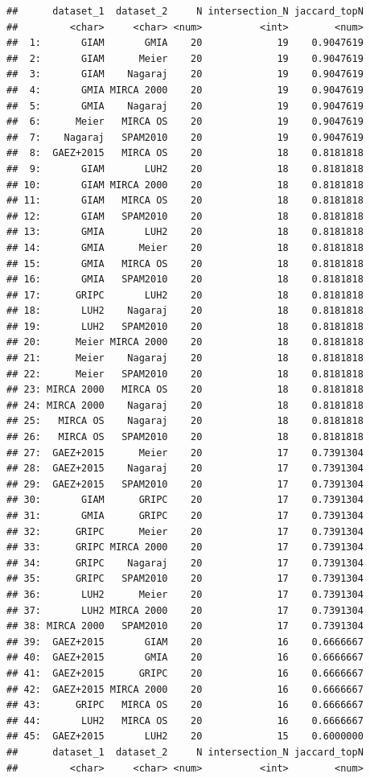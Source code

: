 \documentclass[
  11pt,
]{article}
\begin{document}
\begin{verbatim}
##      dataset_1  dataset_2     N intersection_N jaccard_topN
##         <char>     <char> <num>          <int>        <num>
##  1:       GIAM       GMIA    20             19    0.9047619
##  2:       GIAM      Meier    20             19    0.9047619
##  3:       GIAM    Nagaraj    20             19    0.9047619
##  4:       GMIA MIRCA 2000    20             19    0.9047619
##  5:       GMIA    Nagaraj    20             19    0.9047619
##  6:      Meier   MIRCA OS    20             19    0.9047619
##  7:    Nagaraj   SPAM2010    20             19    0.9047619
##  8:  GAEZ+2015   MIRCA OS    20             18    0.8181818
##  9:       GIAM       LUH2    20             18    0.8181818
## 10:       GIAM MIRCA 2000    20             18    0.8181818
## 11:       GIAM   MIRCA OS    20             18    0.8181818
## 12:       GIAM   SPAM2010    20             18    0.8181818
## 13:       GMIA       LUH2    20             18    0.8181818
## 14:       GMIA      Meier    20             18    0.8181818
## 15:       GMIA   MIRCA OS    20             18    0.8181818
## 16:       GMIA   SPAM2010    20             18    0.8181818
## 17:      GRIPC       LUH2    20             18    0.8181818
## 18:       LUH2    Nagaraj    20             18    0.8181818
## 19:       LUH2   SPAM2010    20             18    0.8181818
## 20:      Meier MIRCA 2000    20             18    0.8181818
## 21:      Meier    Nagaraj    20             18    0.8181818
## 22:      Meier   SPAM2010    20             18    0.8181818
## 23: MIRCA 2000   MIRCA OS    20             18    0.8181818
## 24: MIRCA 2000    Nagaraj    20             18    0.8181818
## 25:   MIRCA OS    Nagaraj    20             18    0.8181818
## 26:   MIRCA OS   SPAM2010    20             18    0.8181818
## 27:  GAEZ+2015      Meier    20             17    0.7391304
## 28:  GAEZ+2015    Nagaraj    20             17    0.7391304
## 29:  GAEZ+2015   SPAM2010    20             17    0.7391304
## 30:       GIAM      GRIPC    20             17    0.7391304
## 31:       GMIA      GRIPC    20             17    0.7391304
## 32:      GRIPC      Meier    20             17    0.7391304
## 33:      GRIPC MIRCA 2000    20             17    0.7391304
## 34:      GRIPC    Nagaraj    20             17    0.7391304
## 35:      GRIPC   SPAM2010    20             17    0.7391304
## 36:       LUH2      Meier    20             17    0.7391304
## 37:       LUH2 MIRCA 2000    20             17    0.7391304
## 38: MIRCA 2000   SPAM2010    20             17    0.7391304
## 39:  GAEZ+2015       GIAM    20             16    0.6666667
## 40:  GAEZ+2015       GMIA    20             16    0.6666667
## 41:  GAEZ+2015      GRIPC    20             16    0.6666667
## 42:  GAEZ+2015 MIRCA 2000    20             16    0.6666667
## 43:      GRIPC   MIRCA OS    20             16    0.6666667
## 44:       LUH2   MIRCA OS    20             16    0.6666667
## 45:  GAEZ+2015       LUH2    20             15    0.6000000
##      dataset_1  dataset_2     N intersection_N jaccard_topN
##         <char>     <char> <num>          <int>        <num>
\end{verbatim}
\end{document}
